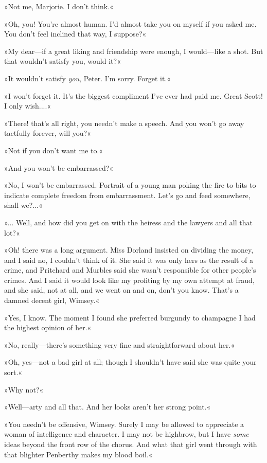 »Not me, Marjorie. I don't think.«

»Oh, you! You're almost human. I'd almost take you on myself if you asked me. You don't feel inclined that way, I suppose?«

»My dear\allowbreak---\allowbreak if a great liking and friendship were enough, I would\allowbreak---\allowbreak like a shot. But that wouldn't satisfy you, would it?«

»It wouldn't satisfy \textit{you}, Peter. I'm sorry. Forget it.«

»I won't forget it. It's the biggest compliment I've ever had paid me. Great Scott! I only wish....«

»There! that's all right, you needn't make a speech. And you won't go away tactfully forever, will you?«

»Not if you don't want me to.«

»And you won't be embarrassed?«

»No, I won't be embarrassed. Portrait of a young man poking the fire to bits to indicate complete freedom from embarrassment. Let's go and feed somewhere, shall we?...«

»... Well, and how did you get on with the heiress and the lawyers and all that lot?«

»Oh! there was a long argument. Miss Dorland insisted on dividing the money, and I said no, I couldn't think of it. She said it was only hers as the result of a crime, and Pritchard and Murbles said she wasn't responsible for other people's crimes. And I said it would look like my profiting by my own attempt at fraud, and she said, not at all, and we went on and on, don't you know. That's a damned decent girl, Wimsey.«

»Yes, I know. The moment I found she preferred burgundy to champagne I had the highest opinion of her.«

»No, really\allowbreak---\allowbreak there's something very fine and straightforward about her.«

»Oh, yes\allowbreak---\allowbreak not a bad girl at all; though I shouldn't have said she was quite your sort.«

»Why not?«

»Well\allowbreak---\allowbreak arty and all that. And her looks aren't her strong point.«

»You needn't be offensive, Wimsey. Surely I may be allowed to appreciate a woman of intelligence and character. I may not be highbrow, but I have \textit{some} ideas beyond the front row of the chorus. And what that girl went through with that blighter Penberthy makes my blood boil.«

